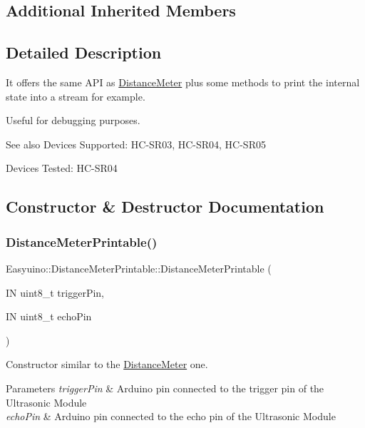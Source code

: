 \subsection*{Additional Inherited Members}


\subsection{Detailed Description}
It offers the same A\+PI as \hyperlink{class_easyuino_1_1_distance_meter}{Distance\+Meter} plus some methods to print the internal state into a stream for example. 

Useful for debugging purposes. \begin{DoxySeeAlso}{See also}
Devices Supported\+: H\+C-\/\+S\+R03, H\+C-\/\+S\+R04, H\+C-\/\+S\+R05 

Devices Tested\+: H\+C-\/\+S\+R04 
\end{DoxySeeAlso}


\subsection{Constructor \& Destructor Documentation}
\mbox{\label{class_easyuino_1_1_distance_meter_printable_a367fe13996801c142f687234390bfc8c}} 
\subsubsection{\texorpdfstring{Distance\+Meter\+Printable()}{DistanceMeterPrintable()}}
{\footnotesize\ttfamily Easyuino\+::\+Distance\+Meter\+Printable\+::\+Distance\+Meter\+Printable (\begin{DoxyParamCaption}\item[{IN uint8\+\_\+t}]{trigger\+Pin,  }\item[{IN uint8\+\_\+t}]{echo\+Pin }\end{DoxyParamCaption})}



Constructor similar to the \hyperlink{class_easyuino_1_1_distance_meter}{Distance\+Meter} one. 


\begin{DoxyParams}{Parameters}
{\em trigger\+Pin} & Arduino pin connected to the trigger pin of the Ultrasonic Module \\
\hline
{\em echo\+Pin} & Arduino pin connected to the echo pin of the Ultrasonic Module \\
\hline
\end{DoxyParams}


